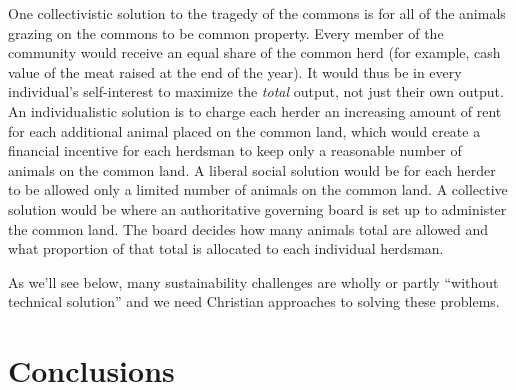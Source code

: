 \documentclass[12pt]{article}
\begin{document}
One collectivistic solution to the tragedy of the commons is for all of the animals grazing on the commons to be common
property. Every member of the community would receive an equal share of the common herd (for example, cash value of the
meat raised at the end of the year). It would thus be in every individual's self-interest to maximize the \emph{total}
output, not just their own output. An individualistic solution is to charge each herder an increasing amount of rent for
each additional animal placed on the common land, which would create a financial incentive for each herdsman to keep
only a reasonable number of animals on the common land. A liberal social solution would be for each herder to be allowed
only a limited number of animals on the common land. A collective solution would be where an authoritative governing
board is set up to administer the common land. The board decides how many animals total are allowed and what proportion
of that total is allocated to each individual herdsman.

As we'll see below, many sustainability challenges are wholly or partly ``without technical solution'' and we need
Christian approaches to solving these problems.






\section{Conclusions}
\label{sec:conclusions}



\printbibliography
\end{document}
